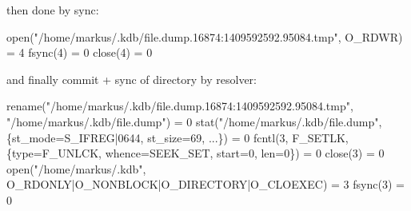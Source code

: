then done by sync\+:


\begin{DoxyCode}
open("/home/markus/.kdb/file.dump.16874:1409592592.95084.tmp",
        O\_RDWR) = 4
fsync(4)                                = 0
close(4)                                = 0
\end{DoxyCode}


and finally commit + sync of directory by resolver\+:


\begin{DoxyCode}
rename("/home/markus/.kdb/file.dump.16874:1409592592.95084.tmp",
        "/home/markus/.kdb/file.dump") = 0
stat("/home/markus/.kdb/file.dump", \{st\_mode=S\_IFREG|0644,
        st\_size=69, ...\}) = 0
fcntl(3, F\_SETLK, \{type=F\_UNLCK, whence=SEEK\_SET, start=0,
        len=0\}) = 0
close(3)                                = 0
open("/home/markus/.kdb",
        O\_RDONLY|O\_NONBLOCK|O\_DIRECTORY|O\_CLOEXEC) = 3
fsync(3)                                = 0
\end{DoxyCode}
 